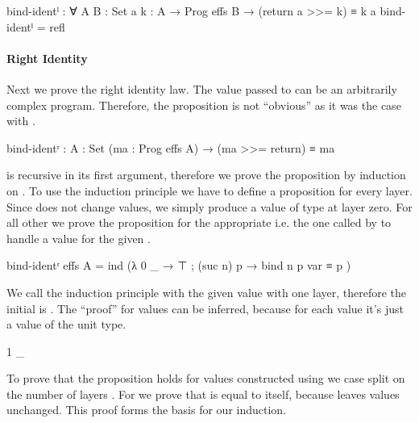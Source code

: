 \begin{code}
bind-identˡ : ∀ {A B : Set} {a} {k : A → Prog effs B} →
  (return a >>= k) ≡ k a
bind-identˡ = refl
\end{code}

\paragraph{Right Identity}
Next we prove the right identity law.
The value passed to \AgdaFunction{>>=} can be an
arbitrarily complex program.
Therefore, the proposition is not ``obvious'' as it was the case with
.

\begin{AgdaAlign}
\begin{code}
bind-identʳ : {A : Set} (ma : Prog effs A) → (ma >>= return) ≡ ma
\end{code}
\AgdaFunction{>>=} is recursive in its first argument, therefore we prove the
proposition by induction on .
To use the induction principle we have to define a proposition for every layer.
Since \AgdaFunction{>>=} does not change values, we simply produce a value of
type  at layer zero.
For all other we prove the proposition for the appropriate
 i.e. the one called by  to handle a value
for the given .

\begin{code}
bind-identʳ {effs} {A} = ind (λ{ 0 _ → ⊤ ; (suc n) p → bind n p var ≡ p })
\end{code}
We call the induction principle with the given value with one layer, therefore
the initial  is .
The ``proof'' for values can be inferred, because for each value it's just a
value of the unit type.

\begin{code}
  1 _
\end{code}
To prove that the proposition holds for values constructed using
 we case split on the number of layers
.
For  we prove that
\AgdaSpace{} is equal to itself,
because \AgdaFunction{>>=} leaves values unchanged.
This proof forms the basis for our induction.


\end{AgdaAlign}
